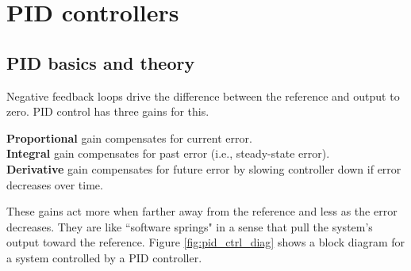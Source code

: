 
\chapter{PID controllers}

\section{PID basics and theory}

Negative feedback loops drive the difference between the \gls{reference} and
\gls{output} to zero. PID control has three gains for this.

\textbf{Proportional} gain compensates for current \gls{error}. \\
\textbf{Integral} gain compensates for past error (i.e.,
\gls{steady-state error}). \\
\textbf{Derivative} gain compensates for future error by slowing controller down
if error decreases over time.

These gains act more when farther away from the \gls{reference} and less as the
\gls{error} decreases. They are like ``software springs" in a sense that pull
the \gls{system}'s \gls{output} toward the \gls{reference}. Figure
\ref{fig:pid_ctrl_diag} shows a block diagram for a \gls{system} controlled by a
PID controller.

